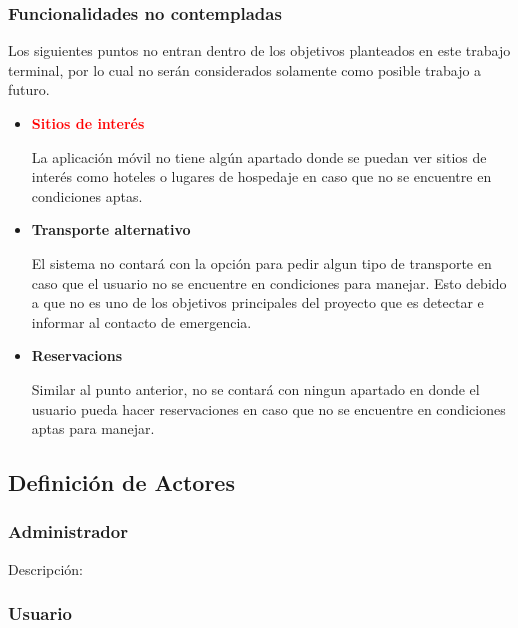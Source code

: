 	\subsubsection{Funcionalidades no contempladas}
	Los siguientes puntos no entran dentro de los objetivos planteados en este trabajo terminal, por lo cual no serán considerados solamente como posible trabajo a futuro.
		\begin{itemize}
			\item {\textbf{\textcolor{red}{Sitios de interés}} \par La aplicación móvil no tiene algún apartado donde se puedan ver sitios de interés como hoteles o lugares de hospedaje en caso que no se encuentre en condiciones aptas.}
			\item {\textbf{Transporte alternativo} \par El sistema no contará con la opción para pedir algun tipo de transporte en caso que el usuario no se encuentre en condiciones para manejar. Esto debido a que no es uno de los objetivos principales del proyecto que es detectar e informar al contacto de emergencia.}
			\item {\textbf{Reservacions} \par Similar al punto anterior, no se contará con ningun apartado en donde el usuario pueda hacer reservaciones en caso que no se encuentre en condiciones aptas para manejar.}
		\end{itemize}
\subsection{Definición de Actores}
	\subsubsection{Administrador}
	Descripción: 
	\subsubsection{Usuario}
